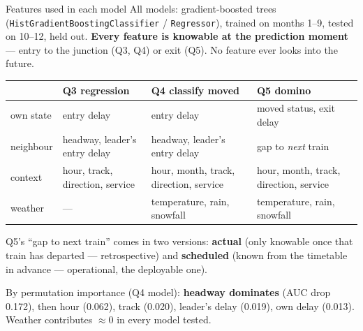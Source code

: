 \documentclass[aspectratio=169,10pt]{beamer}
\newcommand{\srcnote}[1]{{\scriptsize\color{ink3}#1}}
\newcommand{\hl}[1]{{\color{corange}\textbf{#1}}}
\begin{document}
\begin{frame}{Features used in each model}
  All models: gradient-boosted trees (\texttt{HistGradientBoostingClassifier} /
  \texttt{Regressor}), trained on months 1--9, tested on 10--12, held out.
  \hl{Every feature is knowable at the prediction moment} --- entry to the junction
  (Q3, Q4) or exit (Q5). No feature ever looks into the future.

  \vspace{0.5em}
  \centering\small
  \begin{tabular}{@{}p{2.1cm}p{4.0cm}p{4.0cm}p{2.4cm}@{}}
    \toprule
    & Q3 regression & Q4 classify moved & Q5 domino \\
    \midrule
    own state & entry delay & entry delay & moved status, exit delay \\
    neighbour & headway, leader's entry delay & headway, leader's entry delay &
      gap to \emph{next} train \\
    context & hour, track, direction, service & hour, month, track, direction,
      service & hour, month, track, direction, service \\
    weather & --- & temperature, rain, snowfall & temperature, rain, snowfall \\
    \bottomrule
  \end{tabular}

  \vspace{0.8em}
  \raggedright
  \srcnote{Q5's ``gap to next train'' comes in two versions: \textbf{actual} (only
  knowable once that train has departed --- retrospective) and \textbf{scheduled}
  (known from the timetable in advance --- operational, the deployable one).}

  \vspace{0.4em}
  By permutation importance (Q4 model): \hl{headway dominates} (AUC drop 0.172),
  then hour (0.062), track (0.020), leader's delay (0.019), own delay (0.013).
  Weather contributes $\approx$0 in every model tested.
\end{frame}
\end{document}
